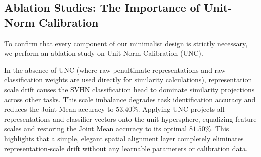 \subsection{Ablation Studies: The Importance of Unit-Norm Calibration}
To confirm that every component of our minimalist design is strictly necessary, we perform an ablation study on Unit-Norm Calibration (UNC). 

In the absence of UNC (where raw penultimate representations and raw classification weights are used directly for similarity calculations), representation scale drift causes the SVHN classification head to dominate similarity projections across other tasks. This scale imbalance degrades task identification accuracy and reduces the Joint Mean accuracy to $53.40\%$. Applying UNC projects all representations and classifier vectors onto the unit hypersphere, equalizing feature scales and restoring the Joint Mean accuracy to its optimal $81.50\%$. This highlights that a simple, elegant spatial alignment layer completely eliminates representation-scale drift without any learnable parameters or calibration data.
